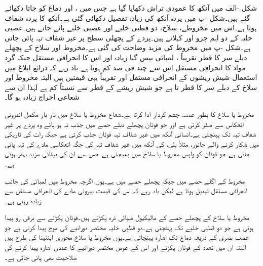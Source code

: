 شکل -الف میں آنکھ کا عمودی تراش دکھایا گیا ہے جس میں ،  اور دماغ کو جاتا  دکھائے گئے ہیں۔شکل -ب میں پردہ آنکھ کی زیادہ تفصیل دکھائی گئی ہے۔آنکھ کا پردہ شفاف ہوتا ہے۔اس میں مخروطے، سلاخ، دو قطبی خلیے اور  عصبی خلیے پائے جاتے ہیں۔عصبی خلیہ کے دو اہم جزو  اور  کہلاتے ہیں۔پردے کے پچھلی سطح پر غیر شفاف تہہ پائی جاتی ہے۔شکل -پ میں مخروط کی مزید وضاحت  کی گئی ہے۔مخروط اور سلاخ کے  پچھلے دبلے سر کا قطر تقریباً ، لمبائی بیس گنا زیادہ اور اس کا انحرافی مستقل  جبکہ گرد مواد کا انحرافی مستقل  اس سے چند فی صد کم ہوتا ہے۔یاد رہے کہ ذرائع ابلاغ میں استعمال شیش ریشوں کے انحرافی مستقل  اور  تقریباً یہی قیمتیں ہیں البتہ مخروط اور سلاخ کے دبلے سر کا قطر  تا  ہے جو شیش ریشے کے قطر سے نسبتاً کم ہے لہٰذا ان سے شعاعی اخراج زیادہ ہو گا۔

مخروط یا سلاخ کا  بطور عدسہ چشم کردار ادا کرتا ہے۔شعاع مخروط یا سلاخ میں بار بار مکمل اندرونی انعکاس سے صفر کرتی ہے اور جو فوٹان پچھلے دبلے حصے میں جذب نہ ہو پائے وہ پردے پر غیر شفاف تہہ تک پہنچتی ہے۔انسانی آنکھ میں غیر شفاف تہہ فوٹان جذب کرتی ہے جبکہ رات کی تاریکی میں شکار کرنے والے جانور، مثلاً بلی،  کی آنکھ میں غیر شفاف تہہ کی جگہ انعکاسی مادے کی تہہ پائی جاتی ہے جو فوٹان کو واپس مخروط یا سلاخ میں بھیجتی ہے جس سے ان کی بینائی مزید بہتر ہوتی ہے۔ 

مخروط کے اگلے حصے میں  جبکہ پچھلے حصے میں  ہے۔یوں اگرچہ مخروط میں لمبائی کی جانب انحرافی مستقل تبدیل ہوتا ہے لیکن یاد رہے کہ اس کی قیمت بیرونی مادے کی انحرافی مستقل سے زیادہ رہتی ہے۔

مخروط یا سلاخ کے پچھلے حصے کے مالیکیول ضیائی ذرہ پکڑتے ہیں۔فوٹان پکڑنے سے برقی رو پیدا ہوتی ہے جو دو قطبی خلیے تک پہنچتی ہے۔دو قطبی خلیہ مختصر دورانیے کی موج پیدا کرتی ہے جو عصب بصری کے ذریعہ دماغ تک اشارہ پہنچاتی ہے۔یوں مخروط یا سلاخ محوری اینٹینا کی طرح ہیں البتہ ان میں  تعدد کے فوٹان پکڑنے اور اس کے عوض مختصر دورانیے کا عددی اشارہ پیدا کرنے کی صلاحیت بھی پائی جاتی ہے۔  

